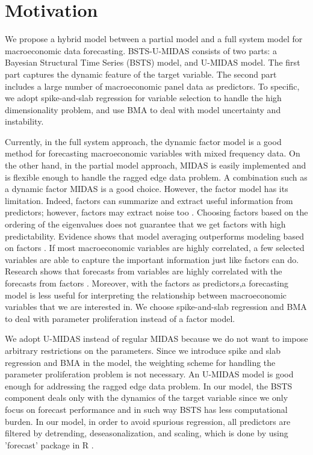 \label{chapter:newsol}





\section{Motivation}   

We propose a hybrid model between a partial model and a full system model for macroeconomic data forecasting. BSTS-U-MIDAS consists of two parts: a Bayesian Structural Time Series (BSTS) model, and  U-MIDAS model. The first part captures the dynamic feature of the target variable. The second part includes a large number of macroeconomic panel data as predictors. To specific, we adopt spike-and-slab regression for variable selection to handle the high dimensionality problem, and use BMA to deal with model uncertainty and instability. 

Currently, in the full system approach, the dynamic factor model is a good method for forecasting macroeconomic variables with mixed frequency data. On the other hand, in the partial model approach, MIDAS is easily implemented and is flexible enough to handle the ragged edge data problem. A combination such as a dynamic factor MIDAS is a good choice. However, the factor model has its limitation. Indeed, factors can summarize and extract useful information from predictors; however, factors may extract noise too \cite{Bai2009}. Choosing factors based on the  ordering of the eigenvalues does not guarantee that we get factors with high predictability. Evidence shows that model averaging outperforms modeling based on factors \cite{Ouysse2013}. If most macroeconomic variables are highly correlated, a few selected variables are able to capture the important information just like factors can do. Research shows that forecasts from variables are highly correlated with the forecasts from factors \cite{Bai2009}. Moreover, with the factors as predictors,a forecasting model is less useful for interpreting the relationship between macroeconomic variables that we are interested in. We choose spike-and-slab regression and BMA to deal with parameter proliferation instead of a factor model.  


We adopt U-MIDAS instead of regular MIDAS because we do not want to impose arbitrary restrictions on the parameters. Since we introduce spike and slab regression and BMA in the model, the weighting scheme for handling the parameter proliferation problem is not necessary. An U-MIDAS model is good enough for addressing the ragged edge data problem. In our model, the BSTS component  deals only with the dynamics of the target variable since we only focus on forecast performance and in such way BSTS has less computational burden. In our model, in order to avoid spurious regression, all predictors are filtered by detrending, deseasonalization, and scaling, which is done by using 'forecast' package in R \cite{Hyndman2015}. 


